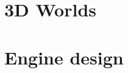 \documentclass[11pt, oldfontcommands, oneside, a4paper]{memoir}
\begin{document}
\part{3D Worlds}







\part{Engine design}
\end{document}
